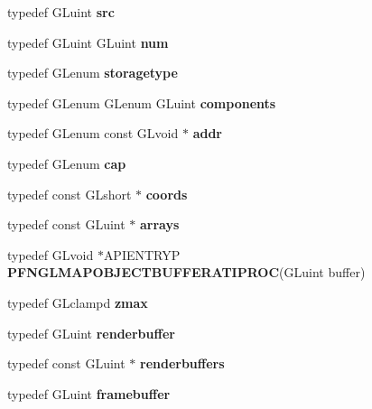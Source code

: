 \begin{DoxyCompactItemize}
\item 
typedef G\+Luint {\bfseries src}\label{_s_d_l__opengl_8h_a72e0fdf0f845ded60b1fada9e9195cd7}

\item 
typedef G\+Luint G\+Luint {\bfseries num}\label{_s_d_l__opengl_8h_abb50fc1ead3a02a46fb52daa2045f95c}

\item 
typedef G\+Lenum {\bfseries storagetype}\label{_s_d_l__opengl_8h_a13d471aa004dfa78f74afa760f89d4a2}

\item 
typedef G\+Lenum G\+Lenum G\+Luint {\bfseries components}\label{_s_d_l__opengl_8h_a452b9ab10170c96a9bef2657c036a2c0}

\item 
typedef G\+Lenum const G\+Lvoid $\ast$ {\bfseries addr}\label{_s_d_l__opengl_8h_a992d3255fe3323885b064097997f4c95}

\item 
typedef G\+Lenum {\bfseries cap}\label{_s_d_l__opengl_8h_ae22de5a430ce81d57d8140824a3e10dc}

\item 
typedef const G\+Lshort $\ast$ {\bfseries coords}\label{_s_d_l__opengl_8h_a84609a7641d05359c95bd5d3ace5a4d3}

\item 
typedef const G\+Luint $\ast$ {\bfseries arrays}\label{_s_d_l__opengl_8h_a53c4d044199cb7ba908d02f46dc10ea5}

\item 
typedef G\+Lvoid $\ast$A\+P\+I\+E\+N\+T\+R\+Y\+P {\bfseries P\+F\+N\+G\+L\+M\+A\+P\+O\+B\+J\+E\+C\+T\+B\+U\+F\+F\+E\+R\+A\+T\+I\+P\+R\+O\+C}(G\+Luint buffer)\label{_s_d_l__opengl_8h_aa0b60df0da216e1ac120e33601c6a219}

\item 
typedef G\+Lclampd {\bfseries zmax}\label{_s_d_l__opengl_8h_af5dc250cf9d7bbba8240af55dff813fe}

\item 
typedef G\+Luint {\bfseries renderbuffer}\label{_s_d_l__opengl_8h_a065ecbf0bfaaefcafcc191ff33481bec}

\item 
typedef const G\+Luint $\ast$ {\bfseries renderbuffers}\label{_s_d_l__opengl_8h_aa17b802a0d8dde64cb30f5d887be5a22}

\item 
typedef G\+Luint {\bfseries framebuffer}\label{_s_d_l__opengl_8h_a9e7d0e14703de01d15e0861b7210b7f8}


\end{DoxyCompactItemize}
